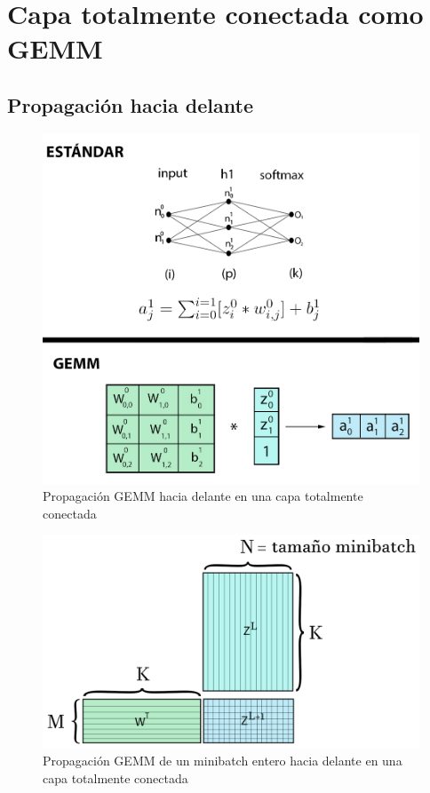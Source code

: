 \section{Capa totalmente conectada como GEMM \cite{nvidia_back_fully_GEMM}}
\subsection{Propagación hacia delante}

\begin{figure}[H]
	\centering
	\includegraphics[scale=0.25]{imagenes/gemm_fully_forward.jpg}  
	\caption{Propagación GEMM hacia delante en una capa totalmente conectada}
	\label{fig:gemm_fully_forward}
\end{figure}


\begin{figure}[H]
	\centering
	\includegraphics[scale=0.25]{imagenes/gemm_fully_forward_minibatch.jpg}  
	\caption{Propagación GEMM de un minibatch entero hacia delante en una capa totalmente conectada}
	\label{fig:gemm_fully_forward_minibatch}
\end{figure}

